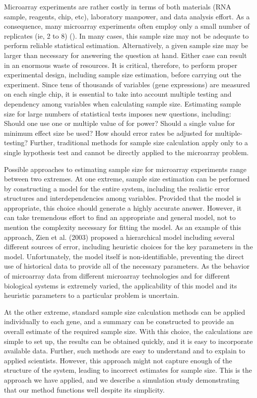 \documentclass{bioinfo}
\begin{document}
Microarray experiments are rather costly in terms of both materials
(RNA sample, reagents, chip, etc), laboratory manpower, and data
analysis effort.  As a consequence, many microarray experiments
often employ only a small number of replicates (ie, 2 to 8)
(\citealp{Speed03}). In many cases, this sample size may not be
adequate to perform reliable statistical estimation.  Alternatively,
a given sample size may be larger than necessary for answering the
question at hand.  Either case can result in an enormous waste of
resources. It is critical, therefore, to perform proper experimental
design, including sample size estimation, before carrying out the
experiment. Since tens of thousands of variables (gene expressions)
are measured on each single chip, it is essential to take into
account multiple testing and dependency among variables when
calculating sample size.  Estimating sample size for large numbers
of statistical tests imposes new questions, including: Should one
use one or multiple value of for power? Should a single value for
minimum effect size be used?  How should error rates be adjusted for
multiple-testing?  Further, traditional methods for sample size
calculation apply only to a single hypothesis test and cannot be
directly applied to the microarray problem.

Possible approaches to estimating sample size for microarray
experiments range between two extremes. At one extreme, sample size
estimation can be performed by constructing a model for the entire
system, including the realistic error structures and
interdependencies among variables. Provided that the model is
appropriate, this choice should generate a highly accurate answer.
However, it can take tremendous effort to find an appropriate and
general model, not to mention the complexity necessary for fitting
the model. As an example of this approach, Zien et al. (2003)
proposed a hierarchical model including several different sources of
error, including heuristic choices for the key parameters in the
model. Unfortunately, the model itself is non-identifiable,
preventing the direct use of historical data to provide all of the
necessary parameters.  As the behavior of microarray data from
different microarray technologies and for different biological
systems is extremely varied, the applicability of this model and its
heuristic parameters to a particular problem is uncertain.

At the other extreme, standard sample size calculation methods can
be applied individually to each gene, and a summary can be
constructed to provide an overall estimate of the required sample
size.  With this choice, the calculations are simple to set up,
the results can be obtained quickly, and it is easy to incorporate
available data. Further, such methods are easy to understand and
to explain to applied scientists.  However, this approach might
not capture enough of the structure of the system, leading to
incorrect estimates for sample size.  This is the approach we have
applied, and we describe a simulation study demonstrating that our
method functions well despite its simplicity.
\end{document}
